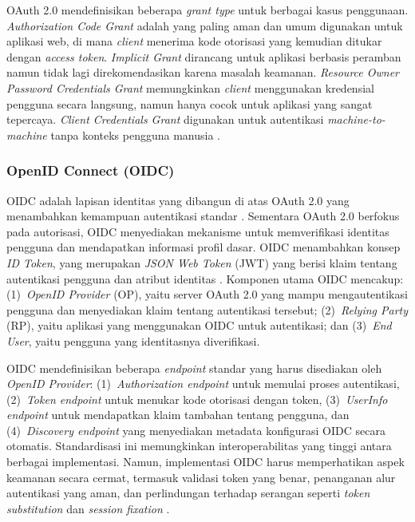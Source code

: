 OAuth 2.0 mendefinisikan beberapa \textit{grant type} untuk berbagai kasus penggunaan. \textit{Authorization Code Grant} adalah yang paling aman dan umum digunakan untuk aplikasi web, di mana \textit{client} menerima kode otorisasi yang kemudian ditukar dengan \textit{access token}. \textit{Implicit Grant} dirancang untuk aplikasi berbasis peramban namun tidak lagi direkomendasikan karena masalah keamanan. \textit{Resource Owner Password Credentials Grant} memungkinkan \textit{client} menggunakan kredensial pengguna secara langsung, namun hanya cocok untuk aplikasi yang sangat tepercaya. \textit{Client Credentials Grant} digunakan untuk autentikasi \textit{machine-to-machine} tanpa konteks pengguna manusia \citep{Lodderstedt_2020_OAuth2BestPractices}.

\subsubsection{OpenID Connect (OIDC)}

OIDC adalah lapisan identitas yang dibangun di atas OAuth 2.0 yang menambahkan kemampuan autentikasi standar \citep{Sakimura_2014_OpenIDConnect}. Sementara OAuth 2.0 berfokus pada autorisasi, OIDC menyediakan mekanisme untuk memverifikasi identitas pengguna dan mendapatkan informasi profil dasar. OIDC menambahkan konsep \textit{ID Token}, yang merupakan \textit{JSON Web Token} (JWT) yang berisi klaim tentang autentikasi pengguna dan atribut identitas \citep{Jones_2015_JWT}. Komponen utama OIDC mencakup: (1)~\textit{OpenID Provider} (OP), yaitu server OAuth 2.0 yang mampu mengautentikasi pengguna dan menyediakan klaim tentang autentikasi tersebut; (2)~\textit{Relying Party} (RP), yaitu aplikasi yang menggunakan OIDC untuk autentikasi; dan (3)~\textit{End User}, yaitu pengguna yang identitasnya diverifikasi.

OIDC mendefinisikan beberapa \textit{endpoint} standar yang harus disediakan oleh \textit{OpenID Provider}: (1)~\textit{Authorization endpoint} untuk memulai proses autentikasi, (2)~\textit{Token endpoint} untuk menukar kode otorisasi dengan token, (3)~\textit{UserInfo endpoint} untuk mendapatkan klaim tambahan tentang pengguna, dan (4)~\textit{Discovery endpoint} yang menyediakan metadata konfigurasi OIDC secara otomatis. Standardisasi ini memungkinkan interoperabilitas yang tinggi antara berbagai implementasi. Namun, implementasi OIDC harus memperhatikan aspek keamanan secara cermat, termasuk validasi token yang benar, penanganan alur autentikasi yang aman, dan perlindungan terhadap serangan seperti \textit{token substitution} dan \textit{session fixation} \citep{Mladenov_2016_OIDCSecurity,Fett_2014_OIDCFormal}.

